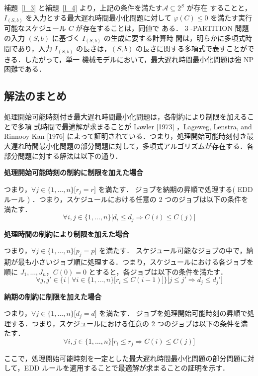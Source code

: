\documentclass[12pt]{optlab-bachelor}
\begin{document}
補題~\ref{l_3} と補題~\ref{l_4} より，上記の条件を満たす$\mathcal{A} \subseteq 2^S$ が存在
することと，$I_{(S,b)}$ を入力とする最大遅れ時間最小化問題に対して
$\varphi(C) \le  0$
を満たす実行可能なスケジュール $C$ が存在することは，同値で
ある．
3 -PARTITION 問題の入力 $(S,b)$ に基づく $I_{(S,b)}$ の生成に要する計算時
間は，明らかに多項式時間であり，入力 $I_{(S,b)}$ の長さは，$(S, b)$
の長さに関する多項式で表すことができる．したがって，単一
機械モデルにおいて，最大遅れ時間最小化問題は強 NP 困難である．

\subsection{解法のまとめ}
処理開始可能時刻付き最大遅れ時間最小化問題は，各制約により制限を加えることで多項
式時間で最適解が求まることが Lawler [1973] \cite{EDD1}，Lageweg, Lenstra, and Rinnooy Kan [1976] \cite{EDD2} によって証明されている．つまり，処理開始可能時刻付き最大遅れ時間最小化問題の部分問題に対して，多項式アルゴリズムが存在する．各部分問題に対する解法は以下の通り．

\noindent\textbf{処理開始可能時刻の制約に制限を加えた場合}

つまり，$\forall j \in \{1,\ldots,n\}\big[ r_j = r \big]$ を満たす．
ジョブを納期の昇順で処理する( EDD ルール ) ．つまり，スケジュールにおける任意の 2 つのジョブは以下の条件を満たす．
$$\forall i, j \in \{1,\ldots,n\}\big[d_i \le d_j \Rightarrow C(i) \le C(j)\big]$$

\noindent\textbf{処理時間の制約により制限を加えた場合}

つまり，$\forall j \in \{1,\ldots,n\}\big[ p_j = p \big]$ を満たす．
スケジュール可能なジョブの中で，納期が最も小さいジョブ順に処理する．つまり，スケジュールにおける各ジョブを順に $J_1,\ldots,J_n$，$C(0) = 0$ とすると，各ジョブは以下の条件を満たす．
$$\forall j, j' \in \bigg\{i \mid \forall i \in \{1,\ldots,n\}\big[r_i \le C(i - 1)\big]\bigg\}\bigg[j \le j' \Rightarrow d_j \le d_j'\bigg]$$

\noindent\textbf{納期の制約に制限を加えた場合}

つまり，$\forall j \in \{1,\ldots,n\}\big[ d_j = d \big]$ を満たす．
ジョブを処理開始可能時刻の昇順で処理する．つまり，スケジュールにおける任意の 2 つのジョブは以下の条件を満たす．
$$\forall i, j \in \{1,\ldots,n\}\big[r_i \le r_j \Rightarrow C(i) \le C(j)\big]$$

ここで，処理開始可能時刻を一定とした最大遅れ時間最小化問題の部分問題に対して，EDD ルールを適用することで最適解が求まることの証明を示す．
\end{document}
